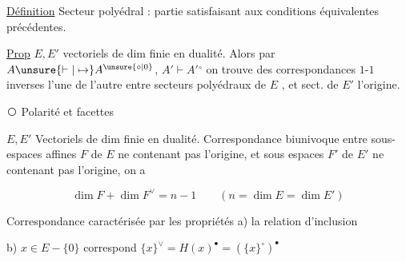 
\uline{Définition} Secteur polyédral : partie satisfaisant aux conditions équivalentes précédentes.

\uline{Prop} $E,E'$ vectoriels de dim finie en dualité. Alors par $A\unsure{\vdash|\mapsto}A^{\unsure{\circ|0}}$, $A'\vdash A'{}^\circ$ on trouve des correspondances $1$-$1$ inverses l'une de l'autre entre secteurs polyédraux de $E$   , et sect.  de $E'$  l'origine.

\textcircled{} Polarité et facettes

$E,E'$ Vectoriels de dim finie en dualité. Correspondance biunivoque entre sous-espaces affines $F$ de $E$ ne contenant pas l'origine, et sous espaces  $F'$ de $E'$ ne contenant pas l'origine, on a


\[
 \dim F+\dim F^\vee=n-1\qquad(n=\dim E=\dim E')
\]

Correspondance caractérisée par les propriétés a)  la relation d'inclusion

b)  $x\in E-\{0\}$ correspond $\{x\}^\vee=H(x)^{\bullet}=(\{x\}^{\circ})^\bullet$
